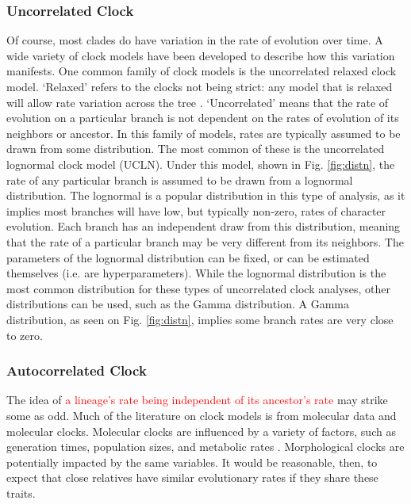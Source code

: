 \documentclass[11pt]{article}
\newcommand{\edit}[1]{{\textcolor{red}{#1}}} %
\begin{document}
\subsubsection{Uncorrelated Clock}
Of course, most clades do have variation in the rate of evolution over time. 
A wide variety of clock models have been developed to describe how this variation manifests.
One common family of clock models is the uncorrelated relaxed clock model.
`Relaxed' refers to the clocks not being strict: any model that is relaxed will allow rate variation across the tree \cite{Drummond2006, Drummond2007}.
`Uncorrelated' means that the rate of evolution on a particular branch is not dependent on the rates of evolution of its neighbors or ancestor.
In this family of models, rates are typically assumed to be drawn from some distribution.
The most common of these is the uncorrelated lognormal clock model (UCLN).
Under this model, shown in Fig. \ref{fig:distn}, the rate of any particular branch is assumed to be drawn from a lognormal distribution.
The lognormal is a popular distribution in this type of analysis, as it implies most branches will have low, but typically non-zero, rates of character evolution. 
Each branch has an independent draw from this distribution, meaning that the rate of a particular branch may be very different from its neighbors.
The parameters of the lognormal distribution can be fixed, or can be estimated themselves (i.e. are hyperparameters).
While the lognormal distribution is the most common distribution for these types of uncorrelated clock analyses, other distributions can be used, such as the Gamma distribution.
A Gamma distribution, as seen on Fig. \ref{fig:distn}, implies some branch rates are very close to zero.



\subsubsection{Autocorrelated Clock}
The idea of %
\edit{a lineage's rate being independent of its ancestor's rate}
may strike some as odd. 
Much of the literature on clock models is from molecular data and molecular clocks.
Molecular clocks are influenced by a variety of factors, such as generation times, population sizes, and metabolic rates \cite{bromham1996, gaut1992}.
Morphological clocks are potentially impacted by the same variables. %
It would be reasonable, then, to expect that close relatives have similar evolutionary rates if they share these traits.
\end{document}
